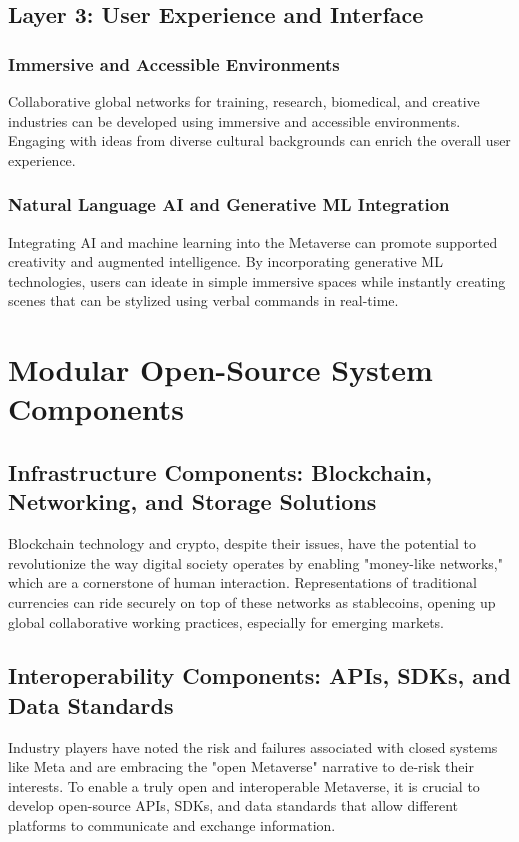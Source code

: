 \subsection{Layer 3: User Experience and Interface}
\subsubsection{Immersive and Accessible Environments}
Collaborative global networks for training, research, biomedical, and creative industries can be developed using immersive and accessible environments. Engaging with ideas from diverse cultural backgrounds can enrich the overall user experience.

\subsubsection{Natural Language AI and Generative ML Integration}
Integrating AI and machine learning into the Metaverse can promote supported creativity and augmented intelligence. By incorporating generative ML technologies, users can ideate in simple immersive spaces while instantly creating scenes that can be stylized using verbal commands in real-time.
\section{Modular Open-Source System Components}
\subsection{Infrastructure Components: Blockchain, Networking, and Storage Solutions}
Blockchain technology and crypto, despite their issues, have the potential to revolutionize the way digital society operates by enabling "money-like networks," which are a cornerstone of human interaction. Representations of traditional currencies can ride securely on top of these networks as stablecoins, opening up global collaborative working practices, especially for emerging markets.

\subsection{Interoperability Components: APIs, SDKs, and Data Standards}
Industry players have noted the risk and failures associated with closed systems like Meta and are embracing the "open Metaverse" narrative to de-risk their interests. To enable a truly open and interoperable Metaverse, it is crucial to develop open-source APIs, SDKs, and data standards that allow different platforms to communicate and exchange information.

